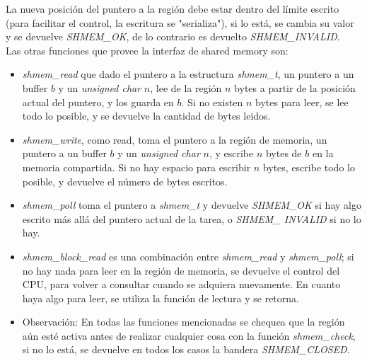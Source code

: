 \documentclass[a4paper]{article}
\begin{document}
La nueva posición del puntero a la región debe estar dentro del
límite escrito (para facilitar el control, la escritura se
"serializa"), si lo está, se cambia su valor y se devuelve
\textit{SHMEM\_OK}, de lo contrario es devuelto
\textit{SHMEM\_INVALID}. \\
Las otras funciones que provee la interfaz de shared memory son:
\begin{itemize}
    \item \textit{shmem\_read} que dado el puntero a la estructura
    \textit{shmem\_t}, un puntero a un buffer $b$ y un \textit{
    unsigned char} $n$, lee de la región $n$ bytes a partir de la
    posición actual del puntero, y los guarda en $b$. Si no
    existen $n$ bytes para leer, se lee todo lo posible, y se
    devuelve la cantidad de bytes leidos.
    \item \textit{shmem\_write}, como read, toma el puntero a la
    región de memoria, un puntero a un buffer $b$ y un \textit{
    unsigned char} $n$, y escribe $n$ bytes de $b$ en la memoria
    compartida. Si no hay espacio para escribir $n$ bytes,
    escribe todo lo posible, y devuelve el número de bytes
    escritos.
    \item \textit{shmem\_poll} toma el puntero a \textit{
    shmem\_t} y devuelve \textit{SHMEM\_OK} si hay algo escrito
    más allá del puntero actual de la tarea, o \textit{SHMEM\_
    INVALID} si no lo hay.
    \item \textit{shmem\_block\_read} es una combinación entre
    \textit{shmem\_read} y \textit{shmem\_poll}; si no hay nada
    para leer en la región de memoria, se devuelve el control
    del CPU, para volver a consultar cuando se adquiera
    nuevamente. En cuanto haya algo para leer, se utiliza la
    función de lectura y se retorna.
    \item Observación: En todas las funciones mencionadas se
    chequea que la región aún esté activa antes de realizar
    cualquier cosa con la función \textit{shmem\_check}, si
    no lo está, se devuelve en todos los casos la bandera
    \textit{SHMEM\_CLOSED}.
\end{itemize}
\end{document}
